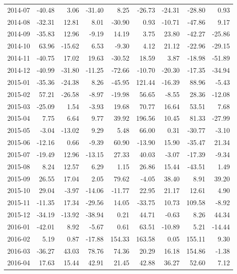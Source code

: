 \begin{table}[ht]
\begin{tabular}{lrrrrrrrr}
  2014-07 & -40.48 & 3.06 & -31.40 & 8.25 & -26.73 & -24.31 & -28.80 & 0.93 \\ 
  2014-08 & -32.31 & 12.81 & 8.01 & -30.90 & 0.93 & -10.71 & -47.86 & 9.17 \\ 
  2014-09 & -35.83 & 12.96 & -9.19 & 14.19 & 3.75 & 23.80 & -42.27 & -25.86 \\ 
  2014-10 & 63.96 & -15.62 & 6.53 & -9.30 & 4.12 & 21.12 & -22.96 & -29.15 \\ 
  2014-11 & -40.75 & 17.02 & 19.63 & -30.52 & 18.59 & 3.87 & -18.98 & -51.89 \\ 
  2014-12 & -40.99 & -31.80 & -11.25 & -72.66 & -10.70 & -20.30 & -17.35 & -34.94 \\ 
  2015-01 & -35.36 & -24.38 & 8.26 & -45.95 & 121.44 & -16.39 & 88.96 & -5.43 \\ 
  2015-02 & 57.21 & -26.58 & -8.97 & -19.98 & 56.65 & -8.55 & 28.36 & -12.08 \\ 
  2015-03 & -25.09 & 1.54 & -3.93 & 19.68 & 70.77 & 16.64 & 53.51 & 7.68 \\ 
  2015-04 & 7.75 & 6.64 & 9.77 & 39.92 & 196.56 & 10.45 & 81.33 & -27.99 \\ 
  2015-05 & -3.04 & -13.02 & 9.29 & 5.48 & 66.00 & 0.31 & -30.77 & -3.10 \\ 
  2015-06 & -12.16 & 0.66 & -9.39 & 60.90 & -13.90 & 15.90 & -35.47 & 21.34 \\ 
  2015-07 & -19.49 & 12.96 & -13.15 & 27.33 & 40.03 & -3.07 & -17.39 & -9.34 \\ 
  2015-08 & 8.24 & 12.57 & 6.29 & 1.15 & 26.86 & 15.44 & -43.51 & 1.49 \\ 
  2015-09 & 26.55 & 17.04 & 2.05 & 79.62 & -4.05 & 38.40 & 8.91 & 39.20 \\ 
  2015-10 & 29.04 & -3.97 & -14.06 & -11.77 & 22.95 & 21.17 & 12.61 & 4.90 \\ 
  2015-11 & -11.35 & 17.34 & -29.56 & 14.05 & -33.75 & 10.73 & 109.58 & -8.92 \\ 
  2015-12 & -34.19 & -13.92 & -38.94 & 0.21 & 44.71 & -0.63 & 8.26 & 44.34 \\ 
  2016-01 & -42.01 & 8.92 & -5.67 & 0.61 & 63.51 & -10.89 & 5.21 & -14.44 \\ 
  2016-02 & 5.19 & 0.87 & -17.88 & 154.33 & 163.58 & 0.05 & 155.11 & 9.30 \\ 
  2016-03 & -36.27 & 43.03 & 78.76 & 74.36 & 20.29 & 16.18 & 154.86 & -1.38 \\ 
  2016-04 & 17.63 & 15.44 & 42.91 & 21.45 & 42.88 & 36.27 & 52.60 & 7.12 \\ 

\end{tabular}
\end{table}
